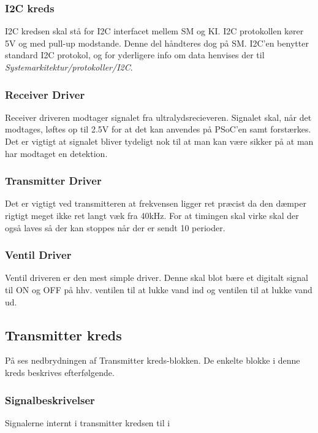 \subsubsection{I2C kreds}
I2C kredsen skal stå for I2C interfacet mellem SM og KI. I2C protokollen kører 5V og med pull-up modstande. Denne del håndteres dog på SM. I2C'en benytter standard I2C protokol, og for yderligere info om data henvises der til \textit{Systemarkitektur/protokoller/I2C}.
\subsubsection{Receiver Driver}
Receiver driveren modtager signalet fra ultralydsrecieveren. Signalet skal, når det modtages, løftes op til 2.5V for at det kan anvendes på PSoC'en samt forstærkes. Det er vigtigt at signalet bliver tydeligt nok til at man kan være sikker på at man har modtaget en detektion. 
\subsubsection{Transmitter Driver}
Det er vigtigt ved transmitteren at frekvensen ligger ret præcist da den dæmper rigtigt meget ikke ret langt væk fra 40kHz. For at timingen skal virke skal der også laves så der kan stoppes når der er sendt 10 perioder.
\subsubsection{Ventil Driver}
Ventil driveren er den mest simple driver. Denne skal blot bære et digitalt signal til ON og OFF på hhv. ventilen til at lukke vand ind og ventilen til at lukke vand ud.

\subsection{Transmitter kreds}
På  ses nedbrydningen af Transmitter kreds-blokken. De enkelte blokke i denne kreds beskrives efterfølgende.

\subsubsection{Signalbeskrivelser}
Signalerne internt i transmitter kredsen til i 


